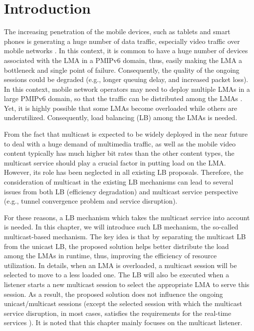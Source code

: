 \section{Introduction}
The increasing penetration of the mobile devices, such as tablets and smart phones is generating a huge number of data traffic, especially video traffic over mobile networks \cite{ericsson,cisco_forecast}. In this context, it is common to have a huge number of devices associated with the LMA in a PMIPv6 domain, thus, easily making the LMA a bottleneck and single point of failure. Consequently, the quality of the ongoing sessions could be degraded (e.g., longer queuing delay, and increased packet loss). In this context, mobile network operators may need to deploy multiple LMAs in a large PMIPv6 domain, so that the traffic can be distributed among the LMAs \cite{PMIPv6}. Yet, it is highly possible that some LMAs become overloaded while others are underutilized. Consequently, load balancing (LB) among the LMAs is needed.

From the fact that multicast is expected to be widely deployed in the near future to deal with a huge demand of multimedia traffic, as well as the mobile video content typically has much higher bit rates than the other content types, the multicast service should play a crucial factor in putting load on the LMA. However, its role has been neglected in all existing LB proposals. Therefore, the consideration of multicast in the existing LB mechanisms can lead to several issues from both LB (efficiency degradation) and multicast service perspective (e.g., tunnel convergence problem and service disruption). 

For these reasons, a LB mechanism which takes the multicast service into account is needed. In this chapter, we will introduce such LB mechanism, the so-called multicast-based mechanism. The key idea is that by separating the multicast LB from the unicast LB, the proposed solution helps better distribute the load among the LMAs in runtime, thus, improving the efficiency of resource utilization. In details, when an LMA is overloaded, a multicast session will be selected to move to a less loaded one. The LB will also be executed when a listener starts a new multicast session to select the appropriate LMA to serve this session. As a result, the proposed solution does not influence the ongoing unicast/multicast sessions (except the selected session with which the multicast service disruption, in most cases, satisfies the requirements for the real-time services \cite{interruption_requirements}). It is noted that this chapter mainly focuses on the multicast listener.  

